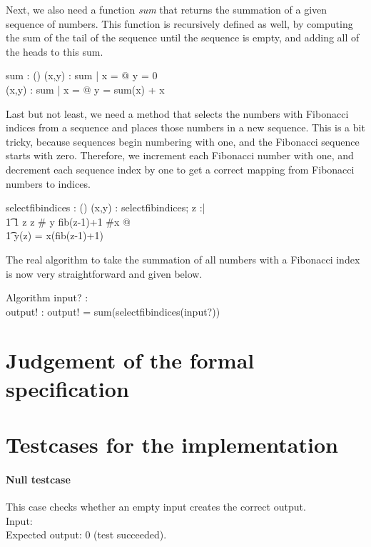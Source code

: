 \documentclass[12pt]{article}
\begin{document}
Next, we also need a function \textit{sum} that returns the summation of a given sequence of numbers. This function is recursively defined as well, by computing the sum of the tail of the sequence until the sequence is empty, and adding all of the heads to this sum.
\begin{axdef}
sum : \power (\seq \real \fun \real)
\where
\forall (x,y) : sum | x = \langle\rangle @ y = 0 \\
\forall (x,y) : sum | x \not = \langle\rangle @ y = sum(\tail x) + \head x
\end{axdef}

Last but not least, we need a method that selects the numbers with Fibonacci indices from a sequence and places those numbers in a new sequence. This is a bit tricky, because sequences begin numbering with one, and the Fibonacci sequence starts with zero. Therefore, we increment each Fibonacci number with one, and decrement each sequence index by one to get a correct mapping from Fibonacci numbers to indices.
\begin{axdef}
selectfibindices : \power (\seq \real \fun \seq \real)
\where
\forall (x,y) : selectfibindices; z :\nat | \\
\t1 1 \leq z \wedge z \leq \# y \wedge fib(z-1)+1 \leq \#x @ \\
\t1 y(z) = x(fib(z-1)+1)
\end{axdef}

The real algorithm to take the summation of all numbers with a Fibonacci index is now very straightforward and given below.
\begin{schema}{Algorithm}
input? : \seq \real \\
output! : \real
\where
output! = sum(selectfibindices(input?))
\end{schema}

\section{Judgement of the formal specification}

\section{Testcases for the implementation}

\paragraph{Null testcase}
This case checks whether an empty input creates the correct output. \\
Input: {} \\
Expected output: 0 (test succeeded).
\end{document}
